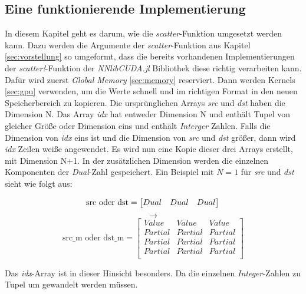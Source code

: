 \subsection{Eine funktionierende Implementierung} \label{sec:funktional_implementaion}

In diesem Kapitel geht es darum, wie die \textit{scatter}-Funktion umgesetzt werden kann.
Dazu werden die Argumente der \textit{scatter}-Funktion aus Kapitel \ref{sec:vorstellung} so
umgeformt, 
dass die bereits vorhandenen Implementierungen der \textit{scatter!}-Funktion der \textit{NNlibCUDA.jl} \cite{nnlibcuda} Bibliothek 
diese richtig verarbeiten kann.
Dafür wird zuerst \textit{Global Memory} \ref{sec:memory} reserviert. Dann werden Kernels \ref{sec:gpu} verwenden, 
um die Werte schnell und im richtigen Format in den neuen Speicherbereich zu kopieren.
Die ursprünglichen Arrays \textit{src} und \textit{dst} haben die Dimension N.
Das Array \textit{idx} hat entweder Dimension N und enthält Tupel von gleicher Größe
oder Dimension eins und enthält \textit{Interger} Zahlen.
Falls die Dimension von \textit{idx} eins ist und die Dimension von \textit{src}
und \textit{dst} größer, dann wird \textit{idx} Zeilen weiße angewendet.
Es wird nun eine Kopie dieser drei Arrays erstellt, mit Dimension N+1.
In der zusätzlichen Dimension werden die einzelnen Komponenten der \textit{Dual}-Zahl gespeichert.
Ein Beispiel mit $N = 1$ für \textit{src} und \textit{dst} sieht wie folgt aus:

\begin{equation}
  \text{src oder dst} = 
\begin{bmatrix}
Dual & Dual & Dual\\
\end{bmatrix}\\  
\end{equation}
$$\rightarrow$$
\begin{equation}
    \text{src\_m oder dst\_m} = 
\begin{bmatrix}
Value   & Value   & Value   \\
Partial & Partial & Partial \\
Partial & Partial & Partial \\
Partial & Partial & Partial \\
\end{bmatrix}
\end{equation}

Das \textit{idx}-Array ist in dieser Hinsicht besonders.
Da die einzelnen \textit{Integer}-Zahlen zu Tupel um gewandelt werden müssen.

